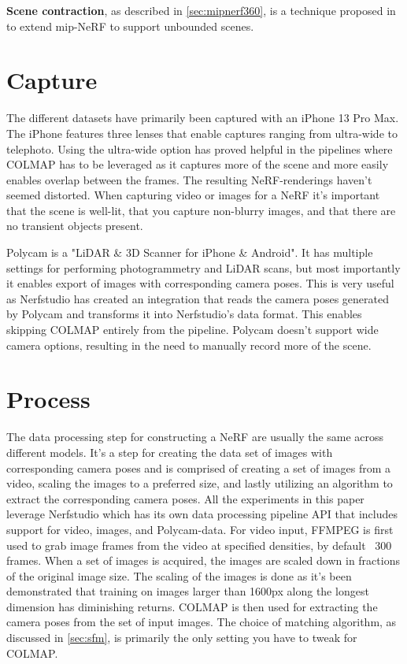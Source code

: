 \textbf{Scene contraction}, as described in \autoref{sec:mipnerf360}, is a technique proposed in \cite{barronMipNeRF360Unbounded2022} to extend mip-NeRF to support unbounded scenes.

\section{Capture}
The different datasets have primarily been captured with an iPhone 13 Pro Max. The iPhone features three lenses that enable captures ranging from ultra-wide to telephoto. Using the ultra-wide option has proved helpful in the pipelines where COLMAP has to be leveraged as it captures more of the scene and more easily enables overlap between the frames. The resulting NeRF-renderings haven't seemed distorted. When capturing video or images for a NeRF it's important that the scene is well-lit, that you capture non-blurry images, and that there are no transient objects present.

Polycam is a "LiDAR \& 3D Scanner for iPhone \& Android". It has multiple settings for performing photogrammetry and LiDAR scans, but most importantly it enables export of images with corresponding camera poses. This is very useful as Nerfstudio has created an integration that reads the camera poses generated by Polycam and transforms it into Nerfstudio's data format. This enables skipping COLMAP entirely from the pipeline. Polycam doesn't support wide camera options, resulting in the need to manually record more of the scene.

\section{Process}
The data processing step for constructing a NeRF are usually the same across different models. It's a step for creating the data set of images with corresponding camera poses and is comprised of creating a set of images from a video, scaling the images to a preferred size, and lastly utilizing an algorithm to extract the corresponding camera poses. All the experiments in this paper leverage Nerfstudio which has its own data processing pipeline API that includes support for video, images, and Polycam-data. For video input, FFMPEG\cite{tomar2006converting} is first used to grab image frames from the video at specified densities, by default ~300 frames. When a set of images is acquired, the images are scaled down in fractions of the original image size. The scaling of the images is done as it's been demonstrated that training on images larger than 1600px along the longest dimension has diminishing returns. COLMAP is then used for extracting the camera poses from the set of input images. The choice of matching algorithm, as discussed in \autoref{sec:sfm}, is primarily the only setting you have to tweak for COLMAP.

